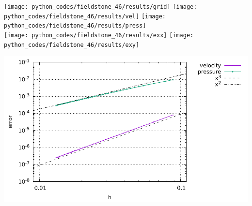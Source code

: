 \begin{center}
\texttt{[image: python\_codes/fieldstone\_46/results/grid]}
\texttt{[image: python\_codes/fieldstone\_46/results/vel]}
\texttt{[image: python\_codes/fieldstone\_46/results/press]}\\
\texttt{[image: python\_codes/fieldstone\_46/results/exx]}
\texttt{[image: python\_codes/fieldstone\_46/results/exy]}
\end{center}

\begin{center}
\includegraphics[width=14cm]{python_codes/fieldstone_46/results/errors.pdf}
\end{center}

